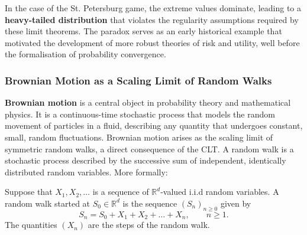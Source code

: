 In the case of the St. Petersburg game, the extreme values dominate, leading to a \textbf{heavy-tailed distribution} that violates the regularity assumptions required by these limit theorems. The paradox serves as an early historical example that motivated the development of more robust theories of risk and utility, well before the formalisation of probability convergence.



\vspace{-1em}

\subsubsection{Brownian Motion as a Scaling Limit of Random Walks}

\textbf{Brownian motion} is a central object in probability theory and mathematical physics. It is a continuous-time stochastic process that models the random movement of particles in a fluid, describing any quantity that undergoes constant, small, random fluctuations.
Brownian motion arises as the scaling limit of symmetric random walks, a direct consequence of the CLT. 
A random walk is a stochastic process described by the successive sum of independent, identically distributed random variables. More formally:
\begin{definition}
    Suppose that $X_1, X_2, \ldots$ is a sequence of $\mathbb{R}^d$-valued i.i.d random variables. A random walk started at $S_0\in\mathbb{R}^d$ is the sequence $(S_n)_{n\geq 0}$ given by
    \begin{equation*}
        S_n = S_0 + X_1 + X_2 + \ldots + X_n, \qquad n \geq 1.
    \end{equation*}
    The quantities $(X_n)$ are the steps of the random walk.
\end{definition}

